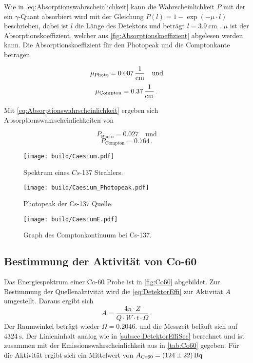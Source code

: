 Wie in \autoref{eq:Absorptionswahrscheinlichkeit} kann die Wahrscheinlichkeit $P$ mit der ein $\gamma$-Quant absorbiert wird mit der Gleichung $P(l) = 1- \exp{(-\mu \cdot l)}$ beschrieben,
dabei ist $l$ die Länge des Detektors und beträgt $l = \SI{3.9}{\centi\meter}$ \cite{v18}.
$\mu$ ist der Absorptionskoeffizient, welcher aus \autoref{fig:Absorptionskoeffizient} abgelesen werden kann. 
Die Absorptionskoeffizient für den Photopeak und die Comptonkante betragen

\begin{equation*}
   \mu_\text{Photo} = \SI{0.007}{\frac{1}{\centi\meter}} \quad \text{und}
\end{equation*}
\begin{equation*}
    \mu_\text{Compton} = \SI{0.37}{\frac{1}{\centi\meter}}\,. 
\end{equation*}

Mit \autoref{eq:Absorptionswahrscheinlichkeit} ergeben sich Absorptionswahrscheinlichkeiten von

\begin{equation*}
    P_\text{Photo} = \num{0.027} \quad \text{und}
 \end{equation*}
\begin{equation*}
     P_\text{Compton} = \num{0.764}\,. 
\end{equation*}


\begin{figure}[H]
    \centering
    \texttt{[image: build/Caesium.pdf]}
    \caption{Spektrum eines $Cs$-137 Strahlers.}
    \label{fig:CeasiumSpektrum}
\end{figure}

\begin{figure}[H]
    \centering
    \texttt{[image: build/Caesium\_Photopeak.pdf]}
    \caption{Photopeak der Cs-137 Quelle.}
    \label{fig:CaesiumPhotopeak}
\end{figure}


\begin{figure}[H]
    \centering
    \texttt{[image: build/CaesiumE.pdf]}
    \caption{Graph des Comptonkontinuum bei Cs-137.}
    \label{fig:Comptonplot}
\end{figure}

\subsection{Bestimmung der Aktivität von Co-60}

Das Energiespektrum einer Co-60 Probe ist in \autoref{fig:Co60} abgebildet.
Zur Bestimmung der Quellenaktivität wird die \autoref{eq:DetektorEffi} zur Aktivität $A$ umgestellt.
Daraus ergibt sich
\begin{equation*}
    A = \frac{4\pi \cdot Z}{Q \cdot W \cdot t \cdot \Omega}\,.
\end{equation*}
Der Raumwinkel beträgt wieder $\Omega = 0.2046$. 
und die Messzeit beläuft sich auf $\SI{4324}{\second}$.
Der Linieninhalt analog wie in \autoref{subsec:DetektorEffiSec} berechnet und ist zusammen mit der Emissionswahrscheinlichkeit aus \cite{LNHB} in \autoref{tab:Co60} gegeben.
Für die Aktivität ergibt sich ein Mittelwert von $A_\text{Co60} = \SI{124 \pm 22}{\becquerel}$

